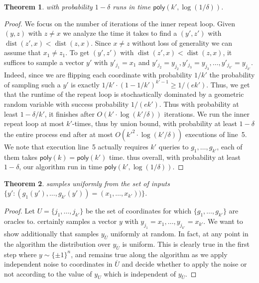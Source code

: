 \documentclass[10pt,a4paper]{article}
\providecommand{\poly}{\mathsf{poly}}
\theoremstyle{plain}
\newtheorem{theorem}{Theorem}[section]
\theoremstyle{remark}
\theoremstyle{plain}
\newcommand{\pmone}{\{\pm 1\}}
\newcommand{\dist}{\operatorname{dist}}
\begin{document}
\begin{theorem}
  with probability $1-\delta$ runs in  time $\poly({k'}, \log(1/\delta))$.
\end{theorem}
\begin{proof}
We focus on the number of iterations of the inner repeat loop.
Given $(y,z)$ with $z\neq x$ we analyze the time it takes to find a $(y',z')$ with $\dist(z',x)<\dist(z,x)$.
Since $x \neq z$ without loss of generality we can assume that $x_1 \neq z_1$. 
To get $(y',z')$ with $\dist(z',x)<\dist(z,x)$, 
it suffices to sample a vector $y'$ with $y'_{j_1}=x_1$ and $y'_{j_2} = y_{j_2}, y'_{j_3} = y_{j_3}, \ldots, y'_{j_{k'}} = y_{j_{k'}}$. Indeed, since we are flipping each coordinate with probability $1/{k'}$ the probability of sampling such a $y'$ is exactly $1/{k'} \cdot (1-1/{k'})^{{k'}-1} \ge 1/(e{k'})$.
Thus, we get that the runtime of the repeat loop is stochastically dominated by a geometric random variable with success probability $1/(e{k'})$. Thus  with probability at least $1-\delta/{k'}$, it finishes after  $O({k'} \cdot \log({k'}/\delta))$ iterations. We run the inner repeat loop at most ${k'}$-times, thus by union bound, with probability at least $1-\delta$ the entire process end after at most  $O({k'}^2 \cdot \log({k'}/\delta))$ executions of line~5.
We note that execution line~5 actually requires ${k'}$ queries to $g_1, \ldots, g_{k'}$, each of them takes $\poly(k) = \poly({k'})$ time. thus overall, with probability at least $1-\delta$, our algorithm run in time $\poly({k'}, \log(1/\delta))$.
\end{proof}

\begin{theorem}
  samples uniformly from the set of inputs $\{y': (g_1(y'), \ldots, g_{k'}(y')) = (x_1, \ldots, x_{k'}))\}$.
\end{theorem}
\begin{proof}
Let $U = \{j_1, \ldots, j_{k'}\}$ be the set of coordinates for which $\{g_1, \ldots, g_{k'}\}$ are	oracles to.
  certainly samples a vector $y$ with $y_{j_1} = x_1, \ldots, y_{j_{k'}} = x_{k'}$.
We want to show additionally that  samples $y_{\overline{U}}$ uniformly at random. In fact, at any point in the algorithm the distribution over $y_{\overline{U}}$ is uniform. This is clearly true in the first step where $y\sim \pmone^n$, and remains true along the algorithm as we apply independent noise to coordinates in $\overline{U}$ and decide whether to apply the noise or not according to the value of $y_U$ which is independent of $y_{\overline{U}}$.
\end{proof}
\end{document}
